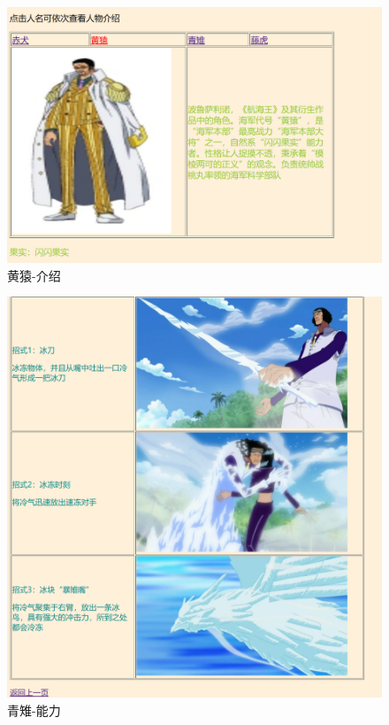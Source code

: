 \documentclass[supercite]{Experimental_Report}
\theoremstyle{definition}
\begin{document}
\begin{figure}[htp]
	\begin{center}
		\includegraphics[scale=0.50]{images/fen5.1.png}
		\caption{黄猿-介绍}
		\label{fig3-10}
	\end{center}
\end{figure}
\newpage
\begin{figure}[htp]
	\begin{center}
		\includegraphics[scale=0.50]{images/fen6.2.png}
		\caption{青雉-能力}
		\label{fig3-11}
	\end{center}
\end{figure}
\end{document}
